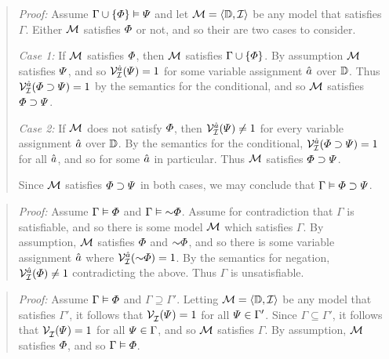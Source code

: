 \begin{quote} 
  \textit{Proof:} Assume $\Gamma \cup \lbrace\varPhi\rbrace \vDash \varPsi$ and let $\mathcal{M}=\langle\mathbb{D},\mathcal{I}\rangle$ be any model that satisfies $\Gamma$.
  Either $\mathcal{M}$ satisfies $\varPhi$ or not, and so their are two cases to consider. 

  \textit{Case 1:}
  If $\mathcal{M}$ satisfies $\varPhi$, then $\mathcal{M}$ satisfies $\Gamma \cup \lbrace\varPhi\rbrace$.
  By assumption $\mathcal{M}$ satisfies $\varPsi$, and so $\mathcal{V}_{\mathcal{I}}^{\hat{a}}(\varPsi)=1$ for some variable assignment $\hat{a}$ over $\mathbb{D}$.
  Thus $\mathcal{V}_{\mathcal{I}}^{\hat{a}}(\varPhi \supset \varPsi)=1$ by the semantics for the conditional, and so $\mathcal{M}$ satisfies $\varPhi \supset \varPsi$.

  \textit{Case 2:}
  If $\mathcal{M}$ does not satisfy $\varPhi$, then $\mathcal{V}_{\mathcal{I}}^{\hat{a}}(\varPsi)\neq 1$ for every variable assignment $\hat{a}$ over $\mathbb{D}$. 
  By the semantics for the conditional, $\mathcal{V}_{\mathcal{I}}^{\hat{a}}(\varPhi \supset \varPsi)=1$ for all $\hat{a}$, and so for some $\hat{a}$ in particular.
  Thus $\mathcal{M}$ satisfies $\varPhi \supset \varPsi$.

  Since $\mathcal{M}$ satisfies $\varPhi \supset \varPsi$ in both cases, we may conclude that $\Gamma \vDash \varPhi \supset \varPsi$. 
\end{quote}




\label{box:Lemma2}

\begin{quote} 
  \textit{Proof:} Assume $\Gamma \vDash \varPhi$ and $\Gamma \models \enot\metaA$.
  Assume for contradiction that $\Gamma$ is satisfiable, and so there is some model $\mathcal{M}$ which satisfies $\Gamma$. 
  By assumption, $\mathcal{M}$ satisfies $\varPhi$ and $\enot\metaA$, and so there is some variable assignment $\hat{a}$ where $\VV{\I}{\va{a}}(\enot\metaA)=1$.
  By the semantics for negation, $\mathcal{V}_{\mathcal{I}}^{\hat{a}}(\varPhi)\neq 1$ contradicting the above.
  Thus $\Gamma$ is unsatisfiable. 
\end{quote}





\label{box:Lemma3}

\begin{quote} 
  \textit{Proof:} Assume $\Gamma \vDash \varPhi$ and $\Gamma \supseteq \Gamma'$.
  Letting $\mathcal{M}=\langle\mathbb{D},\mathcal{I}\rangle$ be any model that satisfies $\Gamma'$, it follows that $\mathcal{V}_{\mathcal{I}}^{}(\varPsi)=1$ for all $\varPsi \in \Gamma'$.
  Since $\Gamma\subseteq \Gamma'$, it follows that $\mathcal{V}_{\mathcal{I}}^{}(\varPsi)=1$ for all $\varPsi \in \Gamma$, and so $\mathcal{M}$ satisfies $\Gamma$. 
  By assumption, $\mathcal{M}$ satisfies $\varPhi$, and so $\Gamma \vDash \varPhi$.
\end{quote}





